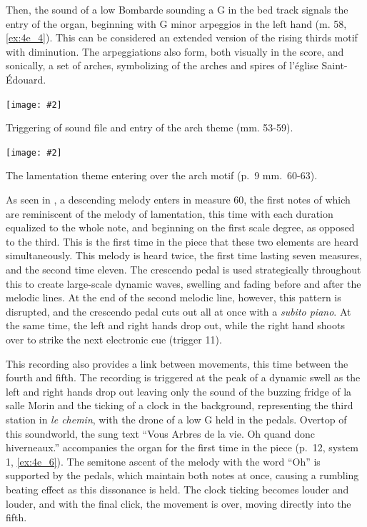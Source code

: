 \documentclass[12pt,twoside,maitrise]{dms_ks}
\newcommand{\customincludeexamples}[4][]{%
    \begin{example}[H]
        \centering
        \texttt{[image: \#2]}
        \caption{#4}
	\label{#3} 
    \end{example}
}
\theoremstyle{definition}
\begin{document}
{Then, the sound of a low Bombarde sounding a G in the bed track signals the entry of the organ, beginning with G minor arpeggios in the left hand (m. 58, \cref{ex:4e_4}). This can be considered an extended version of the rising thirds motif with diminution. 
The arpeggiations also form, both visually in the score, and sonically, a set of arches, symbolizing of the arches and spires of l'église Saint-Édouard.

\customincludeexamples[width=\textwidth]{4e_4}{ex:4e_4}{Triggering of sound file and entry of the arch theme (mm. 53-59).}

\customincludeexamples[width=\textwidth]{4e_5}{ex:4e_5}{The lamentation theme entering over the arch motif (p.~9 mm.~60-63).}

As seen in , a descending melody enters in measure 60, the first notes of which are reminiscent of the melody of lamentation, this time with each duration equalized to the whole note, and beginning on the first scale degree, as opposed to the third. 
This is the first time in the piece that these two elements are heard simultaneously. 
This melody is heard twice, the first time lasting seven measures, and the second time eleven. 
The crescendo pedal is used strategically throughout this to create large-scale dynamic waves, swelling and fading before and after the melodic lines. 
At the end of the second melodic line, however, this pattern is disrupted, and the crescendo pedal cuts out all at once with a \textit{subito piano}. 
At the same time, the left and right hands drop out, while the right hand shoots over to strike the next electronic cue (trigger 11). 

This recording also provides a link between movements, this time between the fourth and fifth. 
The recording is triggered at the peak of a dynamic swell as the left and right hands drop out leaving only the sound of the buzzing fridge of la salle Morin and the ticking of a clock in the background, representing the third station in \textit{le chemin}, with the drone of a low G held in the pedals. 
Overtop of this soundworld, the sung text “Vous Arbres de la vie. Oh quand donc hiverneaux.” accompanies the organ for the first time in the piece (p.~12, system 1, \cref{ex:4e_6}). 
The semitone ascent of the melody with the word “Oh” is supported by the pedals, which maintain both notes at once, causing a rumbling beating effect as this dissonance is held. 
The clock ticking becomes louder and louder, and with the final click, the movement is over, moving directly into the fifth.

}
\end{document}
